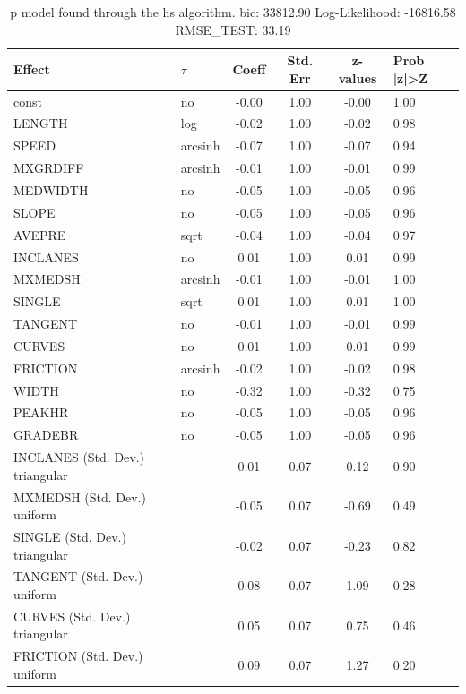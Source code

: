 \begin{table}
	\caption{p model found through the hs algorithm. bic: 33812.90 Log-Likelihood: -16816.58 RMSE_TEST: 33.19}
	\begin{center}
		\begin{tabular}{|l|l|c|c|c|l|}
			\hline
			Effect & $\tau$ & Coeff & Std. Err & z-values & Prob |z|>Z \\
			\hline
			const & no & -0.00 & 1.00 & -0.00 & 1.00 \\
			\hline
			LENGTH & log & -0.02 & 1.00 & -0.02 & 0.98 \\
			\hline
			SPEED & arcsinh & -0.07 & 1.00 & -0.07 & 0.94 \\
			\hline
			MXGRDIFF & arcsinh & -0.01 & 1.00 & -0.01 & 0.99 \\
			\hline
			MEDWIDTH & no & -0.05 & 1.00 & -0.05 & 0.96 \\
			\hline
			SLOPE & no & -0.05 & 1.00 & -0.05 & 0.96 \\
			\hline
			AVEPRE & sqrt & -0.04 & 1.00 & -0.04 & 0.97 \\
			\hline
			INCLANES & no & 0.01 & 1.00 & 0.01 & 0.99 \\
			\hline
			MXMEDSH & arcsinh & -0.01 & 1.00 & -0.01 & 1.00 \\
			\hline
			SINGLE & sqrt & 0.01 & 1.00 & 0.01 & 1.00 \\
			\hline
			TANGENT & no & -0.01 & 1.00 & -0.01 & 0.99 \\
			\hline
			CURVES & no & 0.01 & 1.00 & 0.01 & 0.99 \\
			\hline
			FRICTION & arcsinh & -0.02 & 1.00 & -0.02 & 0.98 \\
			\hline
			WIDTH & no & -0.32 & 1.00 & -0.32 & 0.75 \\
			\hline
			PEAKHR & no & -0.05 & 1.00 & -0.05 & 0.96 \\
			\hline
			GRADEBR & no & -0.05 & 1.00 & -0.05 & 0.96 \\
			\hline
			INCLANES (Std. Dev.) triangular &  & 0.01 & 0.07 & 0.12 & 0.90 \\
			\hline
			MXMEDSH (Std. Dev.) uniform &  & -0.05 & 0.07 & -0.69 & 0.49 \\
			\hline
			SINGLE (Std. Dev.) triangular &  & -0.02 & 0.07 & -0.23 & 0.82 \\
			\hline
			TANGENT (Std. Dev.) uniform &  & 0.08 & 0.07 & 1.09 & 0.28 \\
			\hline
			CURVES (Std. Dev.) triangular &  & 0.05 & 0.07 & 0.75 & 0.46 \\
			\hline
			FRICTION (Std. Dev.) uniform &  & 0.09 & 0.07 & 1.27 & 0.20 \\

\end{tabular}
\end{center}
\end{table}
